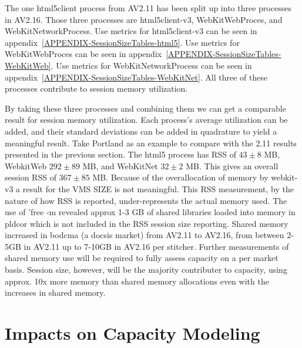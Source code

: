 \documentclass{article}
\begin{document}
The one html5client process from AV2.11 has been split up into three processes in AV2.16. Those three processes are html5client-v3, WebKitWebProces, and WebKitNetworkProcess. Use metrics for html5client-v3 can be seen in appendix~\ref{APPENDIX-SessionSizeTables-html5}. Use metrics for WebKitWebProces can be seen in appendix~\ref{APPENDIX-SessionSizeTables-WebKitWeb}. Use metrics for WebKitNetworkProcess can be seen in appendix~\ref{APPENDIX-SessionSizeTables-WebKitNet}. All three of these processes contribute to session memory utilization. 

By taking these three processes and combining them we can get a comparable result for session memory utilization. Each process's average utilization can be added, and their standard deviations can be added in quadrature to yield a meaningful result. Take Portland as an example to compare with the 2.11 results presented in the previous section. The html5 process has RSS of $43 \pm 8$ MB, WebkitWeb $292 \pm 89$ MB, and WebKitNet $32 \pm 2$ MB. This gives an overall session RSS of $367 \pm 85$ MB. Because of the overallocation of memory by webkit-v3 a result for the VMS SIZE is not meaningful. This RSS measurement, by the nature of how RSS is reported, under-represents the actual memory used. The use of 'free -m revealed approx 1-3 GB of shared libraries loaded into memory in pldcor which is not included in the RSS session size reporting. Shared memory increased in bodcma (a docsis market) from AV2.11 to AV2.16, from between 2-5GB in AV2.11 up to 7-10GB in AV2.16 per stitcher. Further measurements of shared memory use will be required to fully assess capacity on a per market basis. Session size, however, will be the majority contributer to capacity, using approx. 10x more memory than shared memory allocations even with the increases in shared memory. 



\section{Impacts on Capacity Modeling}
\label{SECTION-CapacityModel}
\end{document}
